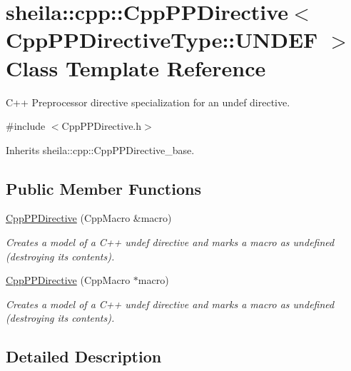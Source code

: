 \hypertarget{classsheila_1_1cpp_1_1CppPPDirective_3_01CppPPDirectiveType_1_1UNDEF_01_4}{}\section{sheila\+:\+:cpp\+:\+:Cpp\+P\+P\+Directive$<$ Cpp\+P\+P\+Directive\+Type\+:\+:U\+N\+D\+EF $>$ Class Template Reference}
\label{classsheila_1_1cpp_1_1CppPPDirective_3_01CppPPDirectiveType_1_1UNDEF_01_4}


C++ Preprocessor directive specialization for an undef directive.  




{\ttfamily \#include $<$Cpp\+P\+P\+Directive.\+h$>$}



Inherits sheila\+::cpp\+::\+Cpp\+P\+P\+Directive\+\_\+base.

\subsection*{Public Member Functions}
\begin{DoxyCompactItemize}
\item 
\hyperlink{classsheila_1_1cpp_1_1CppPPDirective_3_01CppPPDirectiveType_1_1UNDEF_01_4_ae4dba686c72299618cb2811efc53da11}{Cpp\+P\+P\+Directive} (Cpp\+Macro \&macro)
\begin{DoxyCompactList}\small\item\em Creates a model of a C++ undef directive and marks a macro as undefined (destroying it\textquotesingle{}s contents). \end{DoxyCompactList}\item 
\hyperlink{classsheila_1_1cpp_1_1CppPPDirective_3_01CppPPDirectiveType_1_1UNDEF_01_4_af2ff6fd1bd46f18cbbd03e8e757f253c}{Cpp\+P\+P\+Directive} (Cpp\+Macro $\ast$macro)
\begin{DoxyCompactList}\small\item\em Creates a model of a C++ undef directive and marks a macro as undefined (destroying it\textquotesingle{}s contents). \end{DoxyCompactList}\end{DoxyCompactItemize}


\subsection{Detailed Description}
